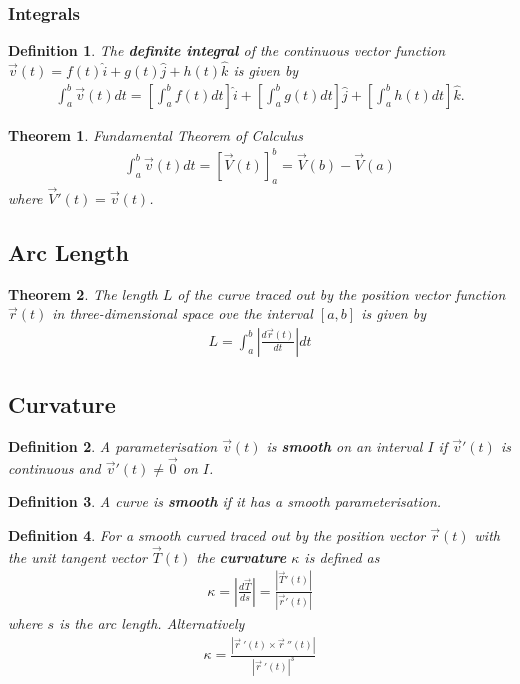 \documentclass{article}
\theoremstyle{sltheorem}
\newtheorem{definition}{Definition}[section]
\newtheorem{theorem}{Theorem}[section]
\newcommand{\ih}{\widehat i}
\newcommand{\jh}{\widehat j}
\newcommand{\kh}{\widehat k}
\newcommand{\dv}[1]{\vec #1\:'}
\newcommand*\B[1]{\textbf{#1}}
\begin{document}
\subsubsection{Integrals}
\begin{definition}
    The \B{definite integral} of the continuous vector function $\vec v(t)=f(t)\ih + g(t)\jh + h(t)\kh$ is given by
    \begin{align*}
        \int_a^b \vec v(t)dt = \left[\int_a^b f(t)dt\right]\ih + \left[\int_a^b g(t) dt\right]\jh + \left[\int_a^b h(t)dt\right] \kh.
    \end{align*}
\end{definition}
\begin{theorem}{Fundamental Theorem of Calculus}
    \begin{align*}
        \int_a^b \vec v(t) dt = \left[\vec V(t)\right]^b_a = \vec V(b) - \vec V(a)
    \end{align*} 
    where $\vec V'(t) = \vec v(t)$.
\end{theorem}
\subsection{Arc Length}
\begin{theorem}
    The length $L$ of the curve traced out by the position vector function $\vec r(t)$ in three-dimensional space ove the interval
    $[a,b]$ is given by
    \begin{align*}
        L = \int_a^b \left|\frac{d\vec r(t)}{dt}\right| dt
    \end{align*}
\end{theorem}
\subsection{Curvature}
\begin{definition}
    A parameterisation $\vec v(t)$ is \B{smooth} on an interval $I$ if $\vec v'(t)$ is continuous and $\vec v'(t) \not = \vec 0$ on $I$.
\end{definition}
\begin{definition}
    A curve is \B{smooth} if it has a smooth parameterisation.
\end{definition}
\begin{definition}
    For a smooth curved traced out by the position vector $\vec r(t)$ with the unit tangent vector 
    $\vec T(t)$ the \B{curvature} $\kappa$ is defined as
    \begin{align*}
        \kappa = \left|\frac{d\vec T}{ds}\right|=\frac{\left| \vec T'(t)\right|}{\left|\vec r'(t)\right|}
    \end{align*}
    where $s$ is the arc length.
    Alternatively
    \begin{align*}
        \kappa = \frac{\left|\dv r(t) \times \dv r'(t)\right|}{|\dv r(t)|^3}
    \end{align*}
\end{definition}
\end{document}
